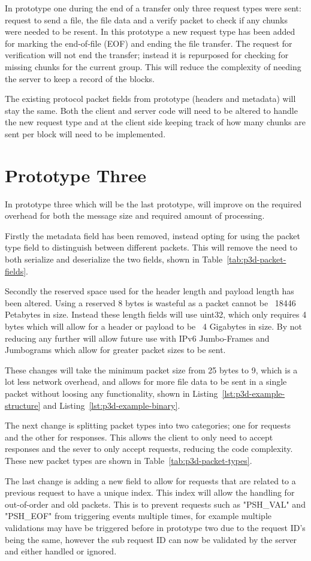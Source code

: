 In prototype one during the end of a transfer only three request types were sent: request to send a file, the file data and a verify packet to check if any chunks were needed to be resent. In this prototype a new request type has been added for marking the end-of-file (EOF) and ending the file transfer. The request for verification will not end the transfer; instead it is repurposed for checking for missing chunks for the current group. This will reduce the complexity of needing the server to keep a record of the blocks.

The existing protocol packet fields from prototype (headers and metadata) will stay the same. Both the client and server code will need to be altered to handle the new request type and at the client side keeping track of how many chunks are sent per block will need to be implemented.


\section{Prototype Three}
In prototype three which will be the last prototype, will improve on the required overhead for both the message size and required amount of processing.

Firstly the metadata field has been removed, instead opting for using the packet type field to distinguish between different packets. This will remove the need to both serialize and deserialize the two fields, shown in Table~\ref{tab:p3d-packet-fields}.

Secondly the reserved space used for the header length and payload length has been altered. Using a reserved 8 bytes is wasteful as a packet cannot be ~18446 Petabytes in size. Instead these length fields will use uint32, which only requires 4 bytes which will allow for a header or payload to be ~4 Gigabytes in size. By not reducing any further will allow future use with IPv6 Jumbo-Frames and Jumbograms which allow for greater packet sizes to be sent. %

These changes will take the minimum packet size from 25 bytes to 9, which is a lot less network overhead, and allows for more file data to be sent in a single packet without loosing any functionality, shown in Listing~\ref{lst:p3d-example-structure} and Listing~\ref{lst:p3d-example-binary}.

The next change is splitting packet types into two categories; one for requests and the other for responses. This allows the client to only need to accept responses and the sever to only accept requests, reducing the code complexity. These new packet types are shown in Table~\ref{tab:p3d-packet-types}.

The last change is adding a new field to allow for requests that are related to a previous request to have a unique index. This index will allow the handling for out-of-order and old packets. This is to prevent requests such as "PSH\_VAL" and "PSH\_EOF" from triggering events multiple times, for example multiple validations may have be triggered before in prototype two due to the request ID's being the same, however the sub request ID can now be validated by the server and either handled or ignored.
